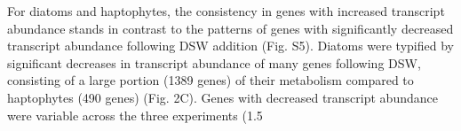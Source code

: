 For diatoms and haptophytes, the consistency in genes with increased transcript abundance stands in contrast to the patterns of genes with significantly decreased transcript abundance following DSW addition (Fig. S5). Diatoms were typified by significant decreases in transcript abundance of many genes following DSW, consisting of a large portion (1389 genes) of their metabolism compared to haptophytes (490 genes) (Fig. 2C). Genes with decreased transcript abundance were variable across the three experiments (1.5%

